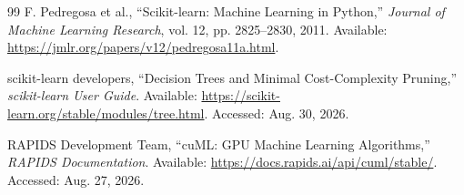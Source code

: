 \begin{thebibliography}{99}
F. Pedregosa et al.,
``Scikit-learn: Machine Learning in Python,''
\textit{Journal of Machine Learning Research}, vol. 12, pp. 2825--2830, 2011.
Available: \url{https://jmlr.org/papers/v12/pedregosa11a.html}.

scikit-learn developers,
``Decision Trees and Minimal Cost-Complexity Pruning,''
\textit{scikit-learn User Guide}.
Available: \url{https://scikit-learn.org/stable/modules/tree.html}.
Accessed: Aug. 30, 2026.

RAPIDS Development Team,
``cuML: GPU Machine Learning Algorithms,''
\textit{RAPIDS Documentation}.
Available: \url{https://docs.rapids.ai/api/cuml/stable/}.
Accessed: Aug. 27, 2026.

\end{thebibliography}
